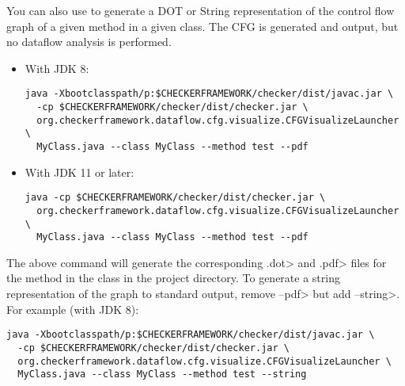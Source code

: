 
You can also use  to generate a DOT
or String representation of the control flow graph of a given method in a given class.
The CFG is generated and output, but no dataflow analysis is performed.

\begin{itemize}

\item With JDK 8:

\begin{smaller}
\begin{Verbatim}
java -Xbootclasspath/p:$CHECKERFRAMEWORK/checker/dist/javac.jar \
  -cp $CHECKERFRAMEWORK/checker/dist/checker.jar \
  org.checkerframework.dataflow.cfg.visualize.CFGVisualizeLauncher \
  MyClass.java --class MyClass --method test --pdf
\end{Verbatim}
\end{smaller}


\item With JDK 11 or later:

\begin{smaller}
\begin{Verbatim}
java -cp $CHECKERFRAMEWORK/checker/dist/checker.jar \
  org.checkerframework.dataflow.cfg.visualize.CFGVisualizeLauncher \
  MyClass.java --class MyClass --method test --pdf
\end{Verbatim}
\end{smaller}

\end{itemize}

\noindent
The above command will generate the corresponding \<.dot> and \<.pdf> files for the
method  in the class  in the project directory.
To generate a string representation of the graph to standard output,
remove \<--pdf> but add \<--string>. For example (with JDK 8):

\begin{smaller}
\begin{Verbatim}
java -Xbootclasspath/p:$CHECKERFRAMEWORK/checker/dist/javac.jar \
  -cp $CHECKERFRAMEWORK/checker/dist/checker.jar \
  org.checkerframework.dataflow.cfg.visualize.CFGVisualizeLauncher \
  MyClass.java --class MyClass --method test --string
\end{Verbatim}
\end{smaller}

